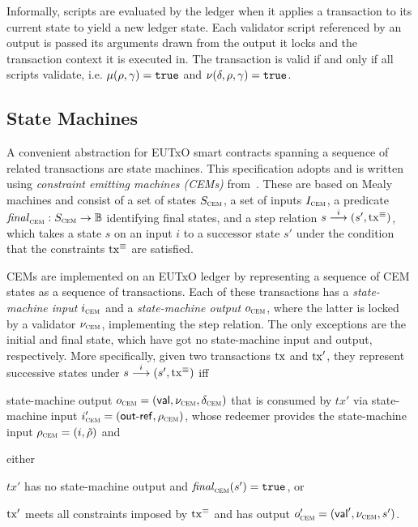 Informally, scripts are evaluated by the ledger when it applies a transaction to
its current state to yield a new ledger state. Each validator script referenced
by an output is passed its arguments drawn from the output it locks and the
transaction context it is executed in. The transaction is valid if and only if
all scripts validate, i.e. $\mu(\rho, \gamma) = \mathtt{true}$ and
$\nu(\delta, \rho, \gamma) = \mathtt{true}$.

\subsection{State Machines}\label{sec:cem}

A convenient abstraction for EUTxO smart contracts spanning a sequence of
related transactions are state machines. This specification adopts and is
written using \emph{constraint emitting machines (CEMs)} from~\cite{eutxo}.
These are based on Mealy machines and consist of a set of states $S_{\textsc{cem}}$, a set
of inputs $I_{\textsc{cem}}$, a predicate \(\mathit{final}_{\textsc{cem}} : S_{\textsc{cem}}\to\mathbb{B}\) identifying final
states, and a step relation \({s}\overset{i}\longrightarrow(s', \mathrm{tx}^\equiv)\), which takes a
state $s$ on an input $i$ to a successor state $s'$ under the condition that the
constraints $\mathrm{tx}^\equiv$ are satisfied.

CEMs are implemented on an EUTxO ledger by representing a sequence of CEM states
as a sequence of transactions. Each of these transactions has a
\emph{state-machine input} $i_{\textsc{cem}}$ and a \emph{state-machine output} $o_{\textsc{cem}}$,
where the latter is locked by a validator $\nu_{\textsc{cem}}$, implementing the step
relation. The only exceptions are the initial and final state, which have got no
state-machine input and output, respectively. More specifically, given two
transactions $\mathrm{tx}$ and $\mathrm{tx}'$, they represent successive states under
\({s}\overset{i}\longrightarrow(s', \mathrm{tx}^\equiv)\) iff

\begin{mitemize}
  \item state-machine output $o_{\textsc{cem}} = (\mathsf{val}, \nu_{\textsc{cem}}, \delta_{\textsc{cem}})$ that
  is consumed by $tx'$ via state-machine input
  $i_{\textsc{cem}}' = (\mathsf{out\textsf{-}{}ref}, \rho_{\textsc{cem}})$, whose redeemer provides the
  state-machine input $\rho_{\textsc{cem}} = (i, \tilde{\rho})$ and
  \item either
    \begin{mitemize}
      \item $tx'$ has no state-machine output and $\mathit{final}_{\textsc{cem}}(s') = \mathtt{true}$, or
      \item $\mathrm{tx}'$ meets all constraints imposed by $\mathrm{tx}^\equiv$ and has output
      $o_{\textsc{cem}}' = (\mathsf{val}', \nu_{\textsc{cem}}, s')$.
    \end{mitemize}
\end{mitemize}


